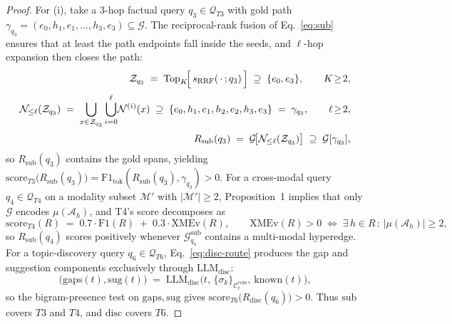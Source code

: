 \documentclass{article}
\begin{document}
\begin{proof}
For (i), take a 3-hop factual query $q_3\!\in\!\mathcal{Q}_{T3}$ with gold path $\gamma_{q_3}\!=\!(e_0,h_1,e_1,\dots,h_3,e_3)\!\subseteq\!\mathcal{G}$. The reciprocal-rank fusion of Eq.~\eqref{eq:sub} ensures that at least the path endpoints fall inside the seeds, and $\ell$-hop expansion then closes the path:
\begin{equation}
\begin{aligned}
\mathcal{Z}_{q_3}\;=\;\mathrm{Top}_{K}\!\Bigl[\,s_{\mathrm{RRF}}(\,\cdot\,;q_3)\,\Bigr]\;\supseteq\;\{e_0,e_3\},\qquad K\!\geq\!2,\\[2pt]
\mathcal{N}_{\leq\ell}(\mathcal{Z}_{q_3})\;=\;\bigcup_{x\in\mathcal{Z}_{q_3}}\bigcup_{i=0}^{\ell}\!\mathcal{N}^{(i)}(x)\;\supseteq\;\{e_0,h_1,e_1,h_2,e_2,h_3,e_3\}\;=\;\gamma_{q_3},\qquad \ell\!\geq\!2,\\[2pt]
R_{\mathrm{sub}}(q_3)\;=\;\mathcal{G}\!\bigl[\mathcal{N}_{\leq\ell}(\mathcal{Z}_{q_3})\bigr]\;\supseteq\;\mathcal{G}[\gamma_{q_3}],
\end{aligned}
\label{eq:p3-T3}
\end{equation}
so $R_{\mathrm{sub}}(q_3)$ contains the gold spans, yielding $\mathrm{score}_{T3}\!\bigl(R_{\mathrm{sub}}(q_3)\bigr)\!=\!\mathrm{F1}_{\mathrm{tok}}(R_{\mathrm{sub}}(q_3),\gamma_{q_3})\!>\!0$. For a cross-modal query $q_4\!\in\!\mathcal{Q}_{T4}$ on a modality subset $\mathcal{M}'$ with $|\mathcal{M}'|\!\geq\!2$, Proposition~1 implies that only $\mathcal{G}$ encodes $\mu(\mathcal{A}_h)$, and T4's score decomposes as
\begin{equation}
\mathrm{score}_{T4}(R)\;=\;0.7\!\cdot\!\mathrm{F1}(R)\;+\;0.3\!\cdot\!\mathrm{XMEv}(R),\qquad \mathrm{XMEv}(R)\!>\!0\;\Longleftrightarrow\;\exists\,h\!\in\!R\,:\,|\mu(\mathcal{A}_h)|\!\geq\!2,
\label{eq:p3-T4}
\end{equation}
so $R_{\mathrm{sub}}(q_4)$ scores positively whenever $\mathcal{G}_{q_4}^{\mathrm{sub}}$ contains a multi-modal hyperedge. For a topic-discovery query $q_6\!\in\!\mathcal{Q}_{T6}$, Eq.~\eqref{eq:disc-route} produces the gap and suggestion components exclusively through $\mathrm{LLM}_{\mathrm{disc}}$:
\begin{equation}
\bigl(\mathrm{gaps}(t),\mathrm{sug}(t)\bigr)\;=\;\mathrm{LLM}_{\mathrm{disc}}\!\bigl(t,\,\{\sigma_k\}_{\mathcal{C}_t^{\mathrm{com}}},\,\mathrm{known}(t)\bigr),
\label{eq:p3-T6}
\end{equation}
so the bigram-presence test on $\mathrm{gaps},\mathrm{sug}$ gives $\mathrm{score}_{T6}\!\bigl(R_{\mathrm{disc}}(q_6)\bigr)\!>\!0$. Thus $\mathrm{sub}$ covers $T3$ and $T4$, and $\mathrm{disc}$ covers $T6$.


\end{proof}
\end{document}
